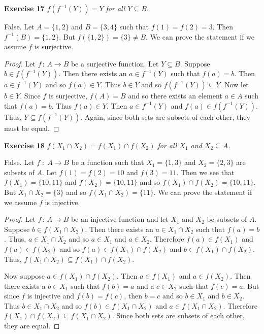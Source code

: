 \documentclass{article}
\begin{document}
\begin{flushleft}
\textbf{Exercise 17}
\textsl{$f(f^{-1}(Y))=Y$ for all $Y \subseteq B$.}\newline

False. Let $A = \{1,2\}$ and $B = \{3,4\}$ such that $f(1)=f(2)=3$. Then $f^{-1}(B) = \{1,2\}$. But $f(\{1,2\}) = \{3\} \neq B$. We can prove the statement if we assume $f$ is surjective.

\begin{proof}
Let $f\, : \, A \rightarrow B$ be a surjective function. Let $Y \subseteq B$. Suppose $b \in f(f^{-1}(Y))$. Then there exists an $a \in f^{-1}(Y)$ such that $f(a) = b$. Then $a \in f^{-1}(Y)$ and so $f(a) \in Y$. Thus $b \in Y$ and so $f(f^{-1}(Y)) \subseteq Y$. Now let $b \in Y$. Since $f$ is surjective, $f(A) = B$ and so there exists an element $a \in A$ such that $f(a) = b$. Thus $f(a) \in Y$. Then $a \in f^{-1}(Y)$ and $f(a) \in f(f^{-1}(Y))$. Thus, $Y \subseteq f(f^{-1}(Y))$. Again, since both sets are subsets of each other, they must be equal.
\end{proof}

\textbf{Exercise 18}
\textsl{$f(X_1 \cap X_2) = f(X_1) \cap f(X_2)$ for all $X_1$ and $X_2 \subseteq A$.}\newline

False. Let $f \; : \; A \rightarrow B$ be a function such that $X_1=\{1,3\}$ and $X_2 = \{2,3\}$ are subsets of $A$. Let $f(1)=f(2)=10$ and $f(3)=11$. Then we see that $f(X_1) = \{10,11\}$ and $f(X_2) = \{10,11\}$ and so $f(X_1) \cap f(X_2) = \{10,11\}$. But $X_1 \cap X_2 = \{3\}$ and so $f(X_1 \cap X_2) = \{11\}$. We can prove the statement if we assume $f$ is injective.
\begin{proof}
Let $f \, : \, A \rightarrow B$ be an injective function and let $X_1$ and $X_2$ be subsets of $A$. Suppose $b \in f(X_1 \cap X_2)$. Then there exists an $a \in X_1 \cap X_2$ such that $f(a) = b$. Thus, $a \in X_1 \cap X_2$ and so $a \in X_1$ and $a \in X_2$. Therefore $f(a) \in f(X_1)$ and $f(a) \in f(X_2)$ and so $f(a) \in f(X_1) \cap f(X_2)$ and $b \in f(X_1) \cap f(X_2)$. Thus, $f(X_1 \cap X_2) \subseteq f(X_1) \cap f(X_2)$.\newline

Now suppose $a \in f(X_1) \cap f(X_2)$. Then $a \in f(X_1)$ and $a \in f(X_2)$. Then there exists a $b\in X_1$ such that $f(b) = a$ and a $c \in X_2$ such that $f(c) = a$. But since $f$ is injective and $f(b) = f(c)$, then $b=c$ and so $b \in X_1$ and $b \in X_2$. Thus $b \in X_1 \cap X_2$ and so $f(b) \in f(X_1 \cap X_2)$ and $a \in f(X_1 \cap X_2)$. Therefore $f(X_1) \cap f(X_2) \subseteq f(X_1 \cap X_2)$. Since both sets are subsets of each other, they are equal.
\end{proof}


\end{flushleft}
\end{document}
